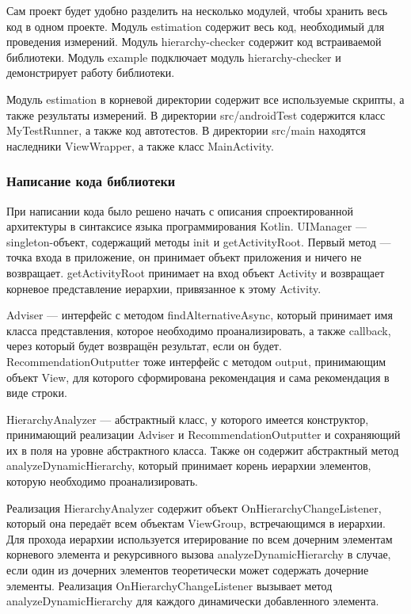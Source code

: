 \documentclass[a4paper,14pt]{extarticle} %
\begin{document}
	Сам проект будет удобно разделить на несколько модулей, чтобы хранить весь код в одном проекте. Модуль estimation содержит весь код, необходимый для проведения измерений. Модуль hierarchy-checker содержит код встраиваемой библиотеки. Модуль example подключает модуль hierarchy-checker и демонстрирует работу библиотеки.
	
	Модуль estimation в корневой директории содержит все используемые скрипты, а также результаты измерений. В директории src/androidTest содержится класс MyTestRunner, а также код автотестов. В директории src/main находятся наследники ViewWrapper, а также класс MainActivity.
	
	\subsubsection{Написание кода библиотеки}
	
	При написании кода было решено начать с описания спроектированной архитектуры в синтаксисе языка программирования Kotlin. UIManager --- singleton-объект, содержащий методы init и getActivityRoot. Первый метод ---  точка входа в приложение, он принимает объект приложения и ничего не возвращает. getActivityRoot принимает на вход объект Activity и возвращает корневое представление иерархии, привязанное к этому Activity. 
	
	Adviser --- интерфейс с методом findAlternativeAsync, который принимает имя класса представления, которое необходимо проанализировать, а также callback, через который будет возвращён результат, если он будет. RecommendationOutputter тоже интерфейс с методом output, принимающим объект View, для которого сформирована рекомендация и сама рекомендация в виде строки. 
	
	HierarchyAnalyzer ---  абстрактный класс, у которого имеется конструктор, принимающий реализации Adviser и RecommendationOutputter и сохраняющий их в поля на уровне абстрактного класса. Также он содержит абстрактный метод analyzeDynamicHierarchy, который принимает корень иерархии элементов, которую необходимо проанализировать.
	
	Реализация HierarchyAnalyzer содержит объект OnHierarchyChangeListener, который она передаёт всем объектам ViewGroup, встречающимся в иерархии. Для прохода иерархии используется итерирование по всем дочерним элементам корневого элемента и рекурсивного вызова analyzeDynamicHierarchy в случае, если один из дочерних элементов теоретически может содержать дочерние элементы. Реализация OnHierarchyChangeListener вызывает метод analyzeDynamicHierarchy для каждого динамически добавленного элемента.
	
\end{document}
